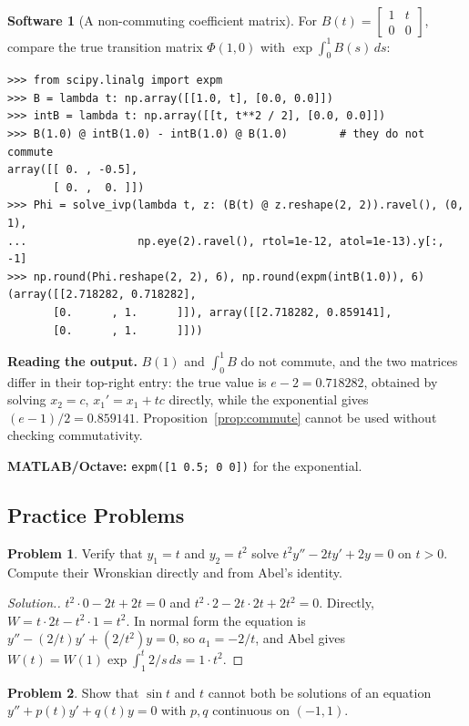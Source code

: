 \documentclass[11pt,a4paper]{article}
\numberwithin{equation}{section}
\theoremstyle{definition}
\newtheorem{software}[thm]{Software}
\newtheorem{problemx}{Problem}[subsection]
\newenvironment{problem}{\begin{problemx}}{\end{problemx}}
\newenvironment{solution}
  {\renewcommand{\qedsymbol}{}\begin{proof}[\textit{Solution}.]}
  {\end{proof}}
\begin{document}
\begin{software}[A non-commuting coefficient matrix]
\label{sw:commute}
For $B(t) = \begin{bmatrix} 1 & t\\ 0 & 0\end{bmatrix}$, compare the true transition matrix $\Phi(1, 0)$ with $\exp\int_0^1B(s)\,ds$:
{\small\begin{verbatim}
>>> from scipy.linalg import expm
>>> B = lambda t: np.array([[1.0, t], [0.0, 0.0]])
>>> intB = lambda t: np.array([[t, t**2 / 2], [0.0, 0.0]])
>>> B(1.0) @ intB(1.0) - intB(1.0) @ B(1.0)        # they do not commute
array([[ 0. , -0.5],
       [ 0. ,  0. ]])
>>> Phi = solve_ivp(lambda t, z: (B(t) @ z.reshape(2, 2)).ravel(), (0, 1),
...                 np.eye(2).ravel(), rtol=1e-12, atol=1e-13).y[:, -1]
>>> np.round(Phi.reshape(2, 2), 6), np.round(expm(intB(1.0)), 6)
(array([[2.718282, 0.718282],
       [0.      , 1.      ]]), array([[2.718282, 0.859141],
       [0.      , 1.      ]]))
\end{verbatim}}
\textbf{Reading the output.} $B(1)$ and $\int_0^1B$ do not commute, and the two matrices differ in their top-right entry: the true value is $e - 2 = 0.718282$, obtained by solving
$x_2 = c$, $x_1' = x_1 + tc$ directly, while the exponential gives $(e - 1)/2 = 0.859141$. Proposition~\ref{prop:commute} cannot be used without checking commutativity.

\textbf{MATLAB/Octave:} \texttt{expm([1 0.5; 0 0])} for the exponential.
\end{software}

\subsection{Practice Problems}

\begin{problem}
Verify that $y_1 = t$ and $y_2 = t^2$ solve $t^2y'' - 2ty' + 2y = 0$ on $t > 0$. Compute their Wronskian directly and from Abel's identity.
\end{problem}

\begin{solution}
$t^2 \cdot 0 - 2t + 2t = 0$ and $t^2 \cdot 2 - 2t \cdot 2t + 2t^2 = 0$. Directly, $W = t \cdot 2t - t^2 \cdot 1 = t^2$. In normal form the equation is $y'' - (2/t)y' + (2/t^2)y = 0$, so $a_1 = -2/t$, and
Abel gives $W(t) = W(1)\exp\int_1^t2/s\,ds = 1 \cdot t^2$.
\end{solution}

\begin{problem}
Show that $\sin t$ and $t$ cannot both be solutions of an equation $y'' + p(t)y' + q(t)y = 0$ with $p, q$ continuous on $(-1, 1)$.
\end{problem}
\end{document}
